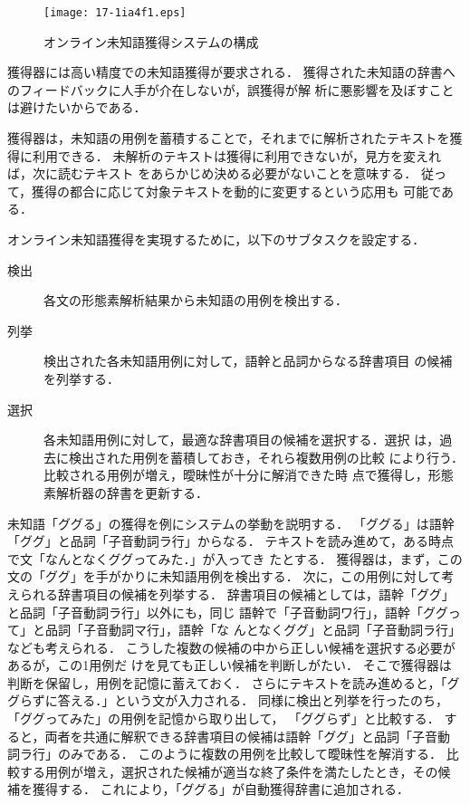 \documentclass[japanese]{jnlp_1.4}
\begin{document}
\begin{figure}[b]
\begin{center}
\texttt{[image: 17-1ia4f1.eps]}
\end{center}
 \caption{オンライン未知語獲得システムの構成}
 \label{fig:system}
\end{figure}

獲得器には高い精度での未知語獲得が要求される．
獲得された未知語の辞書へのフィードバックに人手が介在しないが，誤獲得が解
析に悪影響を及ぼすことは避けたいからである．

獲得器は，未知語の用例を蓄積することで，それまでに解析されたテキストを獲
得に利用できる．
未解析のテキストは獲得に利用できないが，見方を変えれば，次に読むテキスト
をあらかじめ決める必要がないことを意味する．
従って，獲得の都合に応じて対象テキストを動的に変更するという応用も
可能である．

オンライン未知語獲得を実現するために，以下のサブタスクを設定する．
\begin{description}
\item [検出] 各文の形態素解析結果から未知語の用例を検出する．
\item [列挙] 検出された各未知語用例に対して，語幹と品詞からなる辞書項目
	    の候補を列挙する．
\item [選択] 各未知語用例に対して，最適な辞書項目の候補を選択する．選択
	    は，過去に検出された用例を蓄積しておき，それら複数用例の比較
	    により行う．比較される用例が増え，曖昧性が十分に解消できた時
	    点で獲得し，形態素解析器の辞書を更新する．
\end{description}

未知語「ググる」の獲得を例にシステムの挙動を説明する．
「ググる」は語幹「ググ」と品詞「子音動詞ラ行」からなる．
テキストを読み進めて，ある時点で文「なんとなくググってみた．」が入ってき
たとする．
獲得器は，まず，この文の「ググ」を手がかりに未知語用例を検出する．
次に，この用例に対して考えられる辞書項目の候補を列挙する．
辞書項目の候補としては，語幹「ググ」と品詞「子音動詞ラ行」以外にも，同じ
語幹で「子音動詞ワ行」，語幹「ググって」と品詞「子音動詞マ行」，語幹「な
んとなくググ」と品詞「子音動詞ラ行」なども考えられる．
こうした複数の候補の中から正しい候補を選択する必要があるが，この1用例だ
けを見ても正しい候補を判断しがたい．
そこで獲得器は判断を保留し，用例を記憶に蓄えておく．
さらにテキストを読み進めると，「ググらずに答える．」という文が入力される．
同様に検出と列挙を行ったのち，「ググってみた」の用例を記憶から取り出して，
「ググらず」と比較する．
すると，両者を共通に解釈できる辞書項目の候補は語幹「ググ」と品詞「子音動
詞ラ行」のみである．
このように複数の用例を比較して曖昧性を解消する．
比較する用例が増え，選択された候補が適当な終了条件を満たしたとき，その候
補を獲得する．
これにより，「ググる」が自動獲得辞書に追加される．
\end{document}
